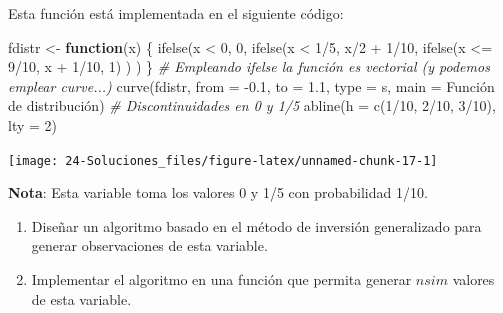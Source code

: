 \documentclass[
]{book}
\newenvironment{Shaded}{\begin{snugshade}}{\end{snugshade}}
\newcommand{\AttributeTok}[1]{\textcolor[rgb]{0.77,0.63,0.00}{#1}}
\newcommand{\CommentTok}[1]{\textcolor[rgb]{0.56,0.35,0.01}{\textit{#1}}}
\newcommand{\ControlFlowTok}[1]{\textcolor[rgb]{0.13,0.29,0.53}{\textbf{#1}}}
\newcommand{\DecValTok}[1]{\textcolor[rgb]{0.00,0.00,0.81}{#1}}
\newcommand{\FloatTok}[1]{\textcolor[rgb]{0.00,0.00,0.81}{#1}}
\newcommand{\FunctionTok}[1]{\textcolor[rgb]{0.00,0.00,0.00}{#1}}
\newcommand{\NormalTok}[1]{#1}
\newcommand{\OtherTok}[1]{\textcolor[rgb]{0.56,0.35,0.01}{#1}}
\newcommand{\SpecialCharTok}[1]{\textcolor[rgb]{0.00,0.00,0.00}{#1}}
\newcommand{\StringTok}[1]{\textcolor[rgb]{0.31,0.60,0.02}{#1}}
\theoremstyle{break}
\theoremstyle{nonumberplain}
\begin{document}
Esta función está implementada en el siguiente código:

\begin{Shaded}
\begin{Highlighting}[]
\NormalTok{fdistr }\OtherTok{\textless{}{-}} \ControlFlowTok{function}\NormalTok{(x) \{}
\FunctionTok{ifelse}\NormalTok{(x }\SpecialCharTok{\textless{}} \DecValTok{0}\NormalTok{, }\DecValTok{0}\NormalTok{,}
    \FunctionTok{ifelse}\NormalTok{(x }\SpecialCharTok{\textless{}} \DecValTok{1}\SpecialCharTok{/}\DecValTok{5}\NormalTok{, x}\SpecialCharTok{/}\DecValTok{2} \SpecialCharTok{+} \DecValTok{1}\SpecialCharTok{/}\DecValTok{10}\NormalTok{,}
        \FunctionTok{ifelse}\NormalTok{(x }\SpecialCharTok{\textless{}=} \DecValTok{9}\SpecialCharTok{/}\DecValTok{10}\NormalTok{, x }\SpecialCharTok{+} \DecValTok{1}\SpecialCharTok{/}\DecValTok{10}\NormalTok{, }\DecValTok{1}\NormalTok{) ) )}
\NormalTok{\}}
\CommentTok{\# Empleando ifelse la función es vectorial (y podemos emplear curve...)}
\FunctionTok{curve}\NormalTok{(fdistr, }\AttributeTok{from =} \SpecialCharTok{{-}}\FloatTok{0.1}\NormalTok{, }\AttributeTok{to =} \FloatTok{1.1}\NormalTok{, }\AttributeTok{type =} \StringTok{\textquotesingle{}s\textquotesingle{}}\NormalTok{, }
      \AttributeTok{main =} \StringTok{\textquotesingle{}Función de distribución\textquotesingle{}}\NormalTok{)}
\CommentTok{\# Discontinuidades en 0 y 1/5}
\FunctionTok{abline}\NormalTok{(}\AttributeTok{h =} \FunctionTok{c}\NormalTok{(}\DecValTok{1}\SpecialCharTok{/}\DecValTok{10}\NormalTok{, }\DecValTok{2}\SpecialCharTok{/}\DecValTok{10}\NormalTok{, }\DecValTok{3}\SpecialCharTok{/}\DecValTok{10}\NormalTok{), }\AttributeTok{lty =} \DecValTok{2}\NormalTok{) }
\end{Highlighting}
\end{Shaded}

\begin{center}\texttt{[image: 24-Soluciones\_files/figure-latex/unnamed-chunk-17-1]} \end{center}

\textbf{Nota}: Esta variable toma los valores 0 y 1/5 con probabilidad 1/10.

\begin{enumerate}
\def\labelenumi{\alph{enumi})}
\item
  Diseñar un algoritmo basado en el método de inversión generalizado
  para generar observaciones de esta variable.
\item
  Implementar el algoritmo en una función que permita generar \(nsim\)
  valores de esta variable.
\end{enumerate}
\end{document}
